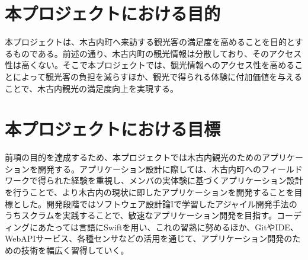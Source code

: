 \section{本プロジェクトにおける目的}
本プロジェクトは、木古内町へ来訪する観光客の満足度を高めることを目的とするものである。前述の通り、木古内町の観光情報は分散しており、そのアクセス性は高くない。そこで本プロジェクトでは、観光情報へのアクセス性を高めることによって観光客の負担を減らすほか、観光で得られる体験に付加価値を与えることで、木古内観光の満足度向上を実現する。

\section{本プロジェクトにおける目標}
前項の目的を達成するため、本プロジェクトでは木古内観光のためのアプリケーションを開発する。アプリケーション設計に際しては、木古内町へのフィールドワークで得られた経験を重視し、メンバの実体験に基づくアプリケーション設計を行うことで、より木古内の現状に即したアプリケーションを開発することを目標とした。開発段階ではソフトウェア設計論Iで学習したアジャイル開発手法のうちスクラムを実践することで、敏速なアプリケーション開発を目指す。コーディングにあたっては言語にSwiftを用い、これの習熟に努めるほか、GitやIDE、WebAPIサービス、各種センサなどの活用を通じて、アプリケーション開発のための技術を幅広く習得していく。
